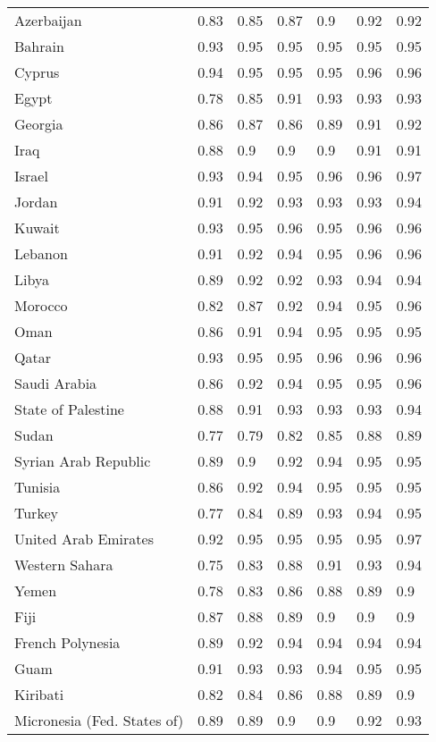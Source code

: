 \begin{longtable}[t]{lllllll}
Azerbaijan & 0.83 & 0.85 & 0.87 & 0.9 & 0.92 & 0.92\\
Bahrain & 0.93 & 0.95 & 0.95 & 0.95 & 0.95 & 0.95\\
\addlinespace
Cyprus & 0.94 & 0.95 & 0.95 & 0.95 & 0.96 & 0.96\\
Egypt & 0.78 & 0.85 & 0.91 & 0.93 & 0.93 & 0.93\\
Georgia & 0.86 & 0.87 & 0.86 & 0.89 & 0.91 & 0.92\\
Iraq & 0.88 & 0.9 & 0.9 & 0.9 & 0.91 & 0.91\\
Israel & 0.93 & 0.94 & 0.95 & 0.96 & 0.96 & 0.97\\
\addlinespace
Jordan & 0.91 & 0.92 & 0.93 & 0.93 & 0.93 & 0.94\\
Kuwait & 0.93 & 0.95 & 0.96 & 0.95 & 0.96 & 0.96\\
Lebanon & 0.91 & 0.92 & 0.94 & 0.95 & 0.96 & 0.96\\
Libya & 0.89 & 0.92 & 0.92 & 0.93 & 0.94 & 0.94\\
Morocco & 0.82 & 0.87 & 0.92 & 0.94 & 0.95 & 0.96\\
\addlinespace
Oman & 0.86 & 0.91 & 0.94 & 0.95 & 0.95 & 0.95\\
Qatar & 0.93 & 0.95 & 0.95 & 0.96 & 0.96 & 0.96\\
Saudi Arabia & 0.86 & 0.92 & 0.94 & 0.95 & 0.95 & 0.96\\
State of Palestine & 0.88 & 0.91 & 0.93 & 0.93 & 0.93 & 0.94\\
Sudan & 0.77 & 0.79 & 0.82 & 0.85 & 0.88 & 0.89\\
\addlinespace
Syrian Arab Republic & 0.89 & 0.9 & 0.92 & 0.94 & 0.95 & 0.95\\
Tunisia & 0.86 & 0.92 & 0.94 & 0.95 & 0.95 & 0.95\\
Turkey & 0.77 & 0.84 & 0.89 & 0.93 & 0.94 & 0.95\\
United Arab Emirates & 0.92 & 0.95 & 0.95 & 0.95 & 0.95 & 0.97\\
Western Sahara & 0.75 & 0.83 & 0.88 & 0.91 & 0.93 & 0.94\\
\addlinespace
Yemen & 0.78 & 0.83 & 0.86 & 0.88 & 0.89 & 0.9\\
Fiji & 0.87 & 0.88 & 0.89 & 0.9 & 0.9 & 0.9\\
French Polynesia & 0.89 & 0.92 & 0.94 & 0.94 & 0.94 & 0.94\\
Guam & 0.91 & 0.93 & 0.93 & 0.94 & 0.95 & 0.95\\
Kiribati & 0.82 & 0.84 & 0.86 & 0.88 & 0.89 & 0.9\\
\addlinespace
Micronesia (Fed. States of) & 0.89 & 0.89 & 0.9 & 0.9 & 0.92 & 0.93\\

\end{longtable}

